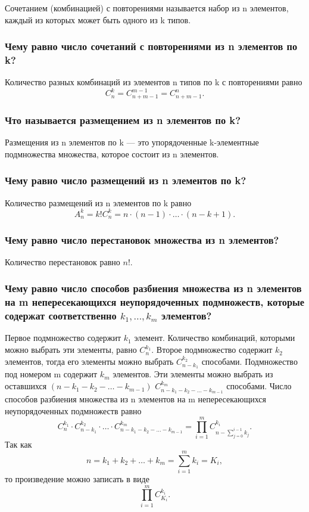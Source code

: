 \documentclass{book}
\begin{document}
Сочетанием (комбинацией) с повторениями называется набор из n элементов, каждый из которых может быть одного из k типов.

\subsubsection*{Чему равно число сочетаний с повторениями из n элементов по k?}

Количество разных комбинаций из элементов n типов по k с повторениями равно
$$C_n^k=C_{n+m-1}^{m-1}=C_{n+m-1}^n.$$

\subsubsection*{Что называется размещением из n элементов по k?}

Размещения из n элементов по k --- это упорядоченные k-элементные подмножества множества, которое состоит из n элементов.

\subsubsection*{Чему равно число размещений из n элементов по k?}

Количество размещений из n элементов по k равно
$$A_n^k=k!C_n^k=n\cdot(n-1)\cdot \dotsc \cdot(n-k+1).$$

\subsubsection*{Чему равно число перестановок множества из n элементов?}

Количество перестановок равно $n!$.

\subsubsection*{Чему равно число способов разбиения множества из n элементов на m непересекающихся неупорядоченных подмножеств, которые содержат соответственно $k_1,  \dotsc , k_m$ элементов?}

Первое подмножество содержит $k_1$ элемент.
Количество комбинаций, которыми можно выбрать эти элементы, равно $C_n^{k_1}$.
Второе подмножество содержит $k_2$ элементов, тогда его элементы можно выбрать $C_{n-k_1}^{k_2}$ способами.
Подмножество под номером m содержит $k_m$ элементов.
Эти элементы можно выбрать из оставшихся
$ \left( n - k_1 - k_2 - \dotsc - k_{m-1} \right) $
$C_{n-k_1-k_2- \dotsc - k_{m-1} }^{k_m} $ способами.
Число способов разбиения множества из n элементов на m непересекающихся неупорядоченных подмножеств равно
$$ C_n^{k_1} \cdot C_{n-k_1}^{k_2} \cdot \dotsc \cdot C_{n-k_1-k_2 - \dotsc - k_{m - 1} }^{k_m} = \prod \limits_{i=1}^m C_{n-\sum \limits_{j=0}^{i-1} k_j}^{k_i}.$$
Так как $$ n = k_1 + k_2 + \dotsc + k_m = \sum \limits_{i=1}^m k_i = K_i,$$
то произведение можно записать в виде
$$ \prod \limits_{i=1}^m C_{K_i}^{k_i}.$$
\end{document}
